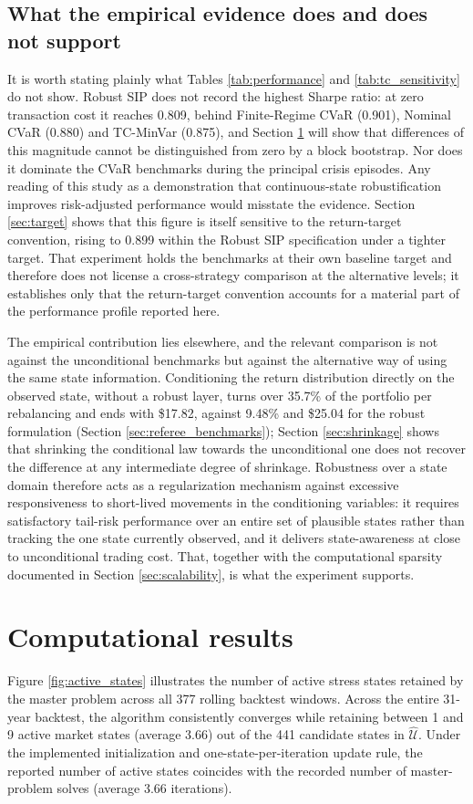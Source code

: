 \documentclass[smallcondensed]{svjour3}
\begin{document}
\subsection{What the empirical evidence does and does not support}\label{sec:empirical_message}
It is worth stating plainly what Tables \ref{tab:performance} and \ref{tab:tc_sensitivity} do not show. Robust SIP does not record the highest Sharpe ratio: at zero transaction cost it reaches 0.809, behind Finite-Regime CVaR (0.901), Nominal CVaR (0.880) and TC-MinVar (0.875), and Section \ref{sec:computational} will show that differences of this magnitude cannot be distinguished from zero by a block bootstrap. Nor does it dominate the CVaR benchmarks during the principal crisis episodes. Any reading of this study as a demonstration that continuous-state robustification improves risk-adjusted performance would misstate the evidence. Section \ref{sec:target} shows that this figure is itself sensitive to the return-target convention, rising to 0.899 within the Robust SIP specification under a tighter target. That experiment holds the benchmarks at their own baseline target and therefore does not license a cross-strategy comparison at the alternative levels; it establishes only that the return-target convention accounts for a material part of the performance profile reported here.

The empirical contribution lies elsewhere, and the relevant comparison is not against the unconditional benchmarks but against the alternative way of using the same state information. Conditioning the return distribution directly on the observed state, without a robust layer, turns over 35.7\% of the portfolio per rebalancing and ends with \$17.82, against 9.48\% and \$25.04 for the robust formulation (Section \ref{sec:referee_benchmarks}); Section \ref{sec:shrinkage} shows that shrinking the conditional law towards the unconditional one does not recover the difference at any intermediate degree of shrinkage. Robustness over a state domain therefore acts as a regularization mechanism against excessive responsiveness to short-lived movements in the conditioning variables: it requires satisfactory tail-risk performance over an entire set of plausible states rather than tracking the one state currently observed, and it delivers state-awareness at close to unconditional trading cost. That, together with the computational sparsity documented in Section \ref{sec:scalability}, is what the experiment supports.

\section{Computational results}\label{sec:computational}
Figure \ref{fig:active_states} illustrates the number of active stress states retained by the master problem across all 377 rolling backtest windows. Across the entire 31-year backtest, the algorithm consistently converges while retaining between 1 and 9 active market states (average 3.66) out of the 441 candidate states in $\widehat{\mathcal{U}}$. Under the implemented initialization and one-state-per-iteration update rule, the reported number of active states coincides with the recorded number of master-problem solves (average 3.66 iterations).
\end{document}
